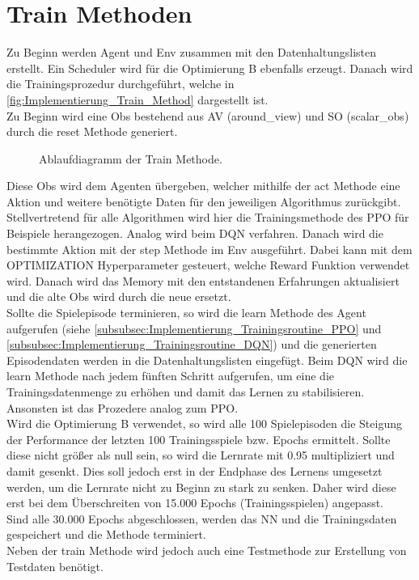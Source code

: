 \section{Train Methoden} \label{sec:Implementierung_train_Methode}
Zu Beginn werden Agent und Env zusammen mit den Datenhaltungslisten  erstellt. Ein Scheduler wird für die Optimierung B  ebenfalls erzeugt. Danach wird die Trainingsprozedur durchgeführt, welche in \autoref{fig:Implementierung_Train_Method} dargestellt ist.\\
Zu Beginn wird eine Obs bestehend aus AV (around\_view) und SO (scalar\_obs) durch die reset Methode  generiert. 
\begin{figure}[H]
	\centering
	
	\caption[Ablaufdiagramm der Train Methode]{Ablaufdiagramm der Train Methode.}
	\label{fig:Implementierung_Train_Method}
\end{figure}
Diese Obs wird dem Agenten übergeben, welcher mithilfe der act Methode eine Aktion und weitere benötigte Daten für den jeweiligen Algorithmus zurückgibt.\\
Stellvertretend für alle Algorithmen wird hier die Trainingsmethode des PPO für Beispiele herangezogen. Analog wird beim DQN verfahren.
Danach wird die bestimmte Aktion mit der step Methode  im Env ausgeführt. Dabei kann mit dem OPTIMIZATION Hyperparameter gesteuert, welche Reward Funktion verwendet wird.
Danach wird das Memory mit den entstandenen Erfahrungen aktualisiert und die alte Obs wird durch die neue ersetzt.\\
Sollte die Spielepisode terminieren, so wird die learn Methode des Agent aufgerufen (siehe \autoref{subsubsec:Implementierung_Trainingsroutine_PPO} und \autoref{subsubsec:Implementierung_Trainingsroutine_DQN}) und die generierten Episodendaten werden in die Datenhaltungslisten eingefügt. 
Beim DQN wird die learn Methode nach jedem fünften Schritt aufgerufen, um eine die Trainingsdatenmenge zu erhöhen und damit das Lernen zu stabilisieren. Ansonsten ist das Prozedere analog zum PPO.\\
Wird die Optimierung B verwendet, so wird alle 100 Spielepisoden die Steigung der Performance der letzten 100 Trainingsspiele bzw. Epochs ermittelt. Sollte diese nicht größer als null sein, so wird die Lernrate mit 0.95 multipliziert und damit gesenkt. Dies soll jedoch erst in der Endphase des Lernens umgesetzt werden, um die Lernrate nicht zu Beginn zu stark zu senken. Daher wird diese erst bei dem Überschreiten von 15.000 Epochs (Trainingsspielen) angepasst.\\
Sind alle 30.000 Epochs abgeschlossen, werden das NN und die Trainingsdaten gespeichert und die Methode terminiert.\\
Neben der train Methode wird jedoch auch eine Testmethode zur Erstellung von Testdaten benötigt.

